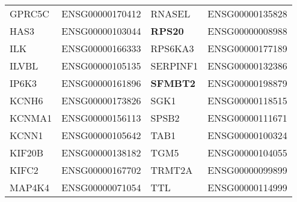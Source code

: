 \begin{table}[!ht]
\begin{tabular}{|l|l||l|l|}
GPRC5C  &  ENSG00000170412  &  RNASEL  &  ENSG00000135828  \\
HAS3  &  ENSG00000103044  &  \textbf{RPS20 } &  ENSG00000008988  \\
ILK  &  ENSG00000166333  &  RPS6KA3  &  ENSG00000177189  \\
ILVBL  &  ENSG00000105135  &  SERPINF1  &  ENSG00000132386  \\
IP6K3  &  ENSG00000161896  &  \textbf{SFMBT2}  &  ENSG00000198879  \\
KCNH6  &  ENSG00000173826  &  SGK1  &  ENSG00000118515  \\
KCNMA1  &  ENSG00000156113  &  SPSB2  &  ENSG00000111671  \\
KCNN1  &  ENSG00000105642  &  TAB1  &  ENSG00000100324  \\
KIF20B  &  ENSG00000138182  &  TGM5  &  ENSG00000104055  \\
KIFC2  &  ENSG00000167702  &  TRMT2A  &  ENSG00000099899  \\
MAP4K4  &  ENSG00000071054  &  TTL  &  ENSG00000114999  \\

\hline
\end{tabular}
\end{table}
\clearpage
